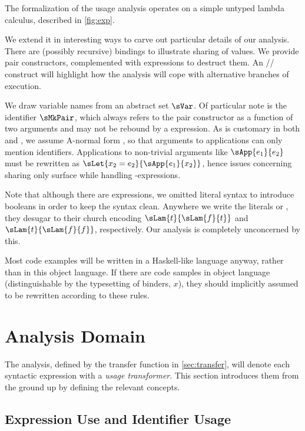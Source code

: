 The formalization of the usage analysis operates on a simple untyped lambda calculus, described in \cref{fig:exp}. 

We extend it in interesting ways to carve out particular details of our analysis.
There are (possibly recursive)  bindings to illustrate sharing of values.
We provide pair constructors, complemented with  expressions to destruct them.
An // construct will highlight how the analysis will cope with alternative branches of execution.

We draw variable names from an abstract set $\sVar$. 
Of particular note is the identifier $\sMkPair$, which always refers to the pair constructor as a function of two arguments and may not be rebound by a  expression. 
As is customary in both \textcite{card} and \textcite{callarity}, we assume A-normal form \parencite{anf}, so that arguments to applications can only mention identifiers. 
Applications to non-trivial arguments like $\sApp{e_1}{e_2}$ must be rewritten as $\sLet{x_2 = e_2}{\sApp{e_1}{x_2}}$, hence issues concerning sharing only surface while handling -expressions.

Note that although there are  expressions, we omitted literal syntax to introduce booleans in order to keep the syntax clean. 
Anywhere we write the literals  or , they desugar to their church encoding $\sLam{t}{\sLam{f}{t}}$ and $\sLam{t}{\sLam{f}{f}}$, respectively.
Our analysis is completely unconcerned by this.

Most code examples will be written in a Haskell-like language anyway, rather than in this object language.
If there are code samples in object language (distinguishable by the typesetting of binders, \eg {} \vs $x$), they should implicitly assumed to be rewritten according to these rules.

\section{Analysis Domain}\label{sec:dom}

The analysis, defined by the transfer function in \cref{sec:transfer}, will denote each syntactic expression with a \emph{usage transformer}. 
This section introduces them from the ground up by defining the relevant concepts.

\subsection{Expression Use and Identifier Usage}

